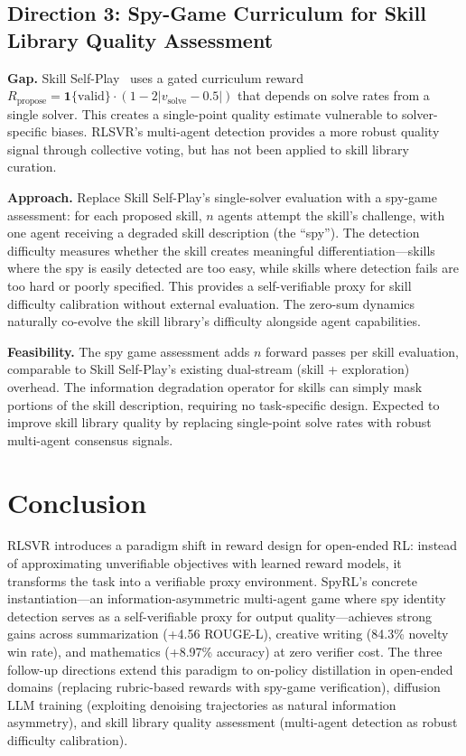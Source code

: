 \documentclass[11pt,a4paper]{article}
\begin{document}
\subsection{Direction 3: Spy-Game Curriculum for Skill Library Quality Assessment}

\textbf{Gap.} Skill Self-Play~\cite{skillselfplay2026} uses a gated curriculum reward $R_{\text{propose}} = \mathbf{1}\{\text{valid}\} \cdot (1 - 2|v_{\text{solve}} - 0.5|)$ that depends on solve rates from a single solver. This creates a single-point quality estimate vulnerable to solver-specific biases. RLSVR's multi-agent detection provides a more robust quality signal through collective voting, but has not been applied to skill library curation.

\textbf{Approach.} Replace Skill Self-Play's single-solver evaluation with a spy-game assessment: for each proposed skill, $n$ agents attempt the skill's challenge, with one agent receiving a degraded skill description (the ``spy''). The detection difficulty measures whether the skill creates meaningful differentiation---skills where the spy is easily detected are too easy, while skills where detection fails are too hard or poorly specified. This provides a self-verifiable proxy for skill difficulty calibration without external evaluation. The zero-sum dynamics naturally co-evolve the skill library's difficulty alongside agent capabilities.

\textbf{Feasibility.} The spy game assessment adds $n$ forward passes per skill evaluation, comparable to Skill Self-Play's existing dual-stream (skill + exploration) overhead. The information degradation operator for skills can simply mask portions of the skill description, requiring no task-specific design. Expected to improve skill library quality by replacing single-point solve rates with robust multi-agent consensus signals.

\section{Conclusion}
RLSVR introduces a paradigm shift in reward design for open-ended RL: instead of approximating unverifiable objectives with learned reward models, it transforms the task into a verifiable proxy environment. SpyRL's concrete instantiation---an information-asymmetric multi-agent game where spy identity detection serves as a self-verifiable proxy for output quality---achieves strong gains across summarization (+4.56 ROUGE-L), creative writing (84.3\% novelty win rate), and mathematics (+8.97\% accuracy) at zero verifier cost. The three follow-up directions extend this paradigm to on-policy distillation in open-ended domains (replacing rubric-based rewards with spy-game verification), diffusion LLM training (exploiting denoising trajectories as natural information asymmetry), and skill library quality assessment (multi-agent detection as robust difficulty calibration).
\end{document}
